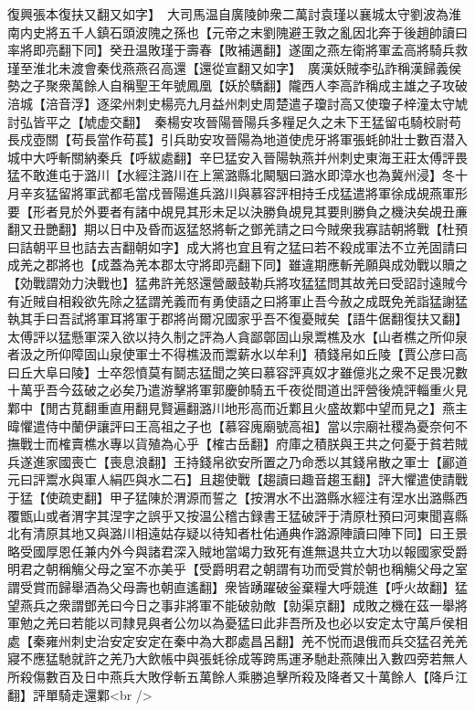 復興張本復扶又翻又如字】　大司馬温自廣陵帥衆二萬討袁瑾以襄城太守劉波為淮南内史將五千人鎮石頭波隗之孫也【元帝之末劉隗避王敦之亂因北奔于後趙帥讀曰率將即亮翻下同】癸丑温敗瑾于壽春【敗補邁翻】遂圍之燕左衛將軍孟高將騎兵救瑾至淮北未渡會秦伐燕燕召高還【還從宣翻又如字】　廣漢妖賊李弘詐稱漢歸義侯勢之子聚衆萬餘人自稱聖王年號鳳凰【妖於驕翻】隴西人李高詐稱成主雄之子攻破涪城【涪音浮】逐梁州刺史楊亮九月益州刺史周楚遣子瓊討高又使瓊子梓潼太守虓討弘皆平之【虓虚交翻】　秦楊安攻晉陽晉陽兵多糧足久之未下王猛留屯騎校尉苟長戍壺關【苟長當作苟萇】引兵助安攻晉陽為地道使虎牙將軍張蚝帥壯士數百潜入城中大呼斬關納秦兵【呼紱處翻】辛巳猛安入晉陽執燕并州刺史東海王莊太傅評畏猛不敢進屯于潞川【水經注潞川在上黨潞縣北闞駰曰潞水即漳水也為冀州浸】冬十月辛亥猛留將軍武都毛當戍晉陽進兵潞川與慕容評相持壬戍猛遣將軍徐成覘燕軍形要【形者見於外要者有諸中覘見其形未足以決勝負覘見其要則勝負之機決矣覘丑亷翻又丑艷翻】期以日中及昏而返猛怒將斬之鄧羌請之曰今賊衆我寡詰朝將戰【杜預曰詰朝平旦也詰去吉翻朝如字】成大將也宜且宥之猛曰若不殺成軍法不立羌固請曰成羌之郡將也【成蓋為羌本郡太守將即亮翻下同】雖違期應斬羌願與成効戰以贖之【効戰謂効力決戰也】猛弗許羌怒還營嚴鼓勒兵將攻猛猛問其故羌曰受詔討遠賊今有近賊自相殺欲先除之猛謂羌義而有勇使語之曰將軍止吾今赦之成既免羌詣猛謝猛執其手曰吾試將軍耳將軍于郡將尚爾况國家乎吾不復憂賊矣【語牛倨翻復扶又翻】太傅評以猛懸軍深入欲以持久制之評為人貪鄙鄣固山泉鬻樵及水【山者樵之所仰泉者汲之所仰障固山泉使軍士不得樵汲而鬻薪水以牟利】積錢帛如丘陵【賈公彦曰高曰丘大阜曰陵】士卒怨憤莫有鬬志猛聞之笑曰慕容評真奴才雖億兆之衆不足畏况數十萬乎吾今茲破之必矣乃遣游擊將軍郭慶帥騎五千夜從間道出評營後燒評輜重火見鄴中【閒古莧翻重直用翻見賢遍翻潞川地形高而近鄴且火盛故鄴中望而見之】燕主暐懼遣侍中蘭伊讓評曰王高祖之子也【慕容廆廟號高祖】當以宗廟社稷為憂奈何不撫戰士而榷賣樵水專以貨殖為心乎【榷古岳翻】府庫之積朕與王共之何憂于貧若賊兵遂進家國喪亡【喪息浪翻】王持錢帛欲安所置之乃命悉以其錢帛散之軍士【酈道元曰評鬻水與軍人絹匹與水二石】且趨使戰【趨讀曰趣音趨玉翻】評大懼遣使請戰于猛【使疏吏翻】甲子猛陳於渭源而誓之【按渭水不出潞縣水經注有涅水出潞縣西覆甑山或者渭字其涅字之誤乎又按温公稽古録書王猛破評于清原杜預曰河東聞喜縣北有清原其地又與潞川相遠姑存疑以待知者杜佑通典作潞源陣讀曰陣下同】曰王景略受國厚恩任兼内外今與諸君深入賊地當竭力致死有進無退共立大功以報國家受爵明君之朝稱觴父母之室不亦美乎【受爵明君之朝謂有功而受賞於朝也稱觴父母之室謂受賞而歸舉酒為父母壽也朝直遙翻】衆皆踴躍破釡棄糧大呼競進【呼火故翻】猛望燕兵之衆謂鄧羌曰今日之事非將軍不能破勍敵【勍渠京翻】成敗之機在茲一舉將軍勉之羌曰若能以司隸見與者公勿以為憂猛曰此非吾所及也必以安定太守萬戶侯相處【秦雍州刺史治安定安定在秦中為大郡處昌呂翻】羌不悦而退俄而兵交猛召羌羌寢不應猛馳就許之羌乃大飲帳中與張蚝徐成等跨馬運矛馳赴燕陳出入數四旁若無人所殺傷數百及日中燕兵大敗俘斬五萬餘人乘勝追擊所殺及降者又十萬餘人【降戶江翻】評單騎走還鄴<br />
